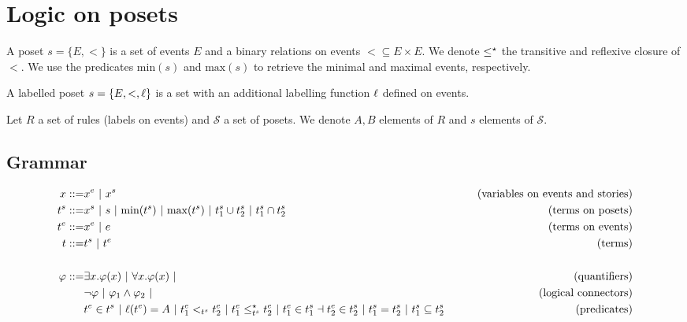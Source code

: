 \section{Logic on posets}

\begin{definition}[Poset]
  \label{def:poset}
  A poset $s=\{E,<\}$ is a set of events $E$ and a binary relations on events $< \subseteq E\times E$. We denote $\leq^{\star}$ the transitive and reflexive closure of $<$.
  We use the predicates $\text{min}(s)$ and $\text{max}(s)$ to retrieve the minimal and maximal events, respectively.

  A labelled poset $s=\{E,<,\ell\}$ is a set with an additional labelling function $\ell$ defined on events.
\end{definition}



Let $R$ a set of rules (labels on events) and $\mathcal{S}$ a set of posets.
We denote $A,B$ elements of $R$ and $s$ elements of $\mathcal{S}$.

\subsection{Grammar}

\begin{align*}
  x ::= & x^e ~|~ x^s & \tag{variables on events and stories} \\
  t^s ::= & x^s ~|~ s ~|~ \text{min}(t^s) ~|~ \text{max}(t^s) ~|~ t^s_1 \cup t^s_2 ~|~ t^s_1 \cap t^s_2 &\tag{terms on posets} \\
  t^e ::= & x^e ~|~ e & \tag{terms on events}\\
  t ::= & t^s ~|~ t^e & \tag{terms}\\
  \\
  \varphi ::= & \exists x.\varphi(x) ~|~ \forall x.\varphi(x) ~|&\tag{quantifiers}\\
  & \neg \varphi ~|~\varphi_1 \wedge \varphi_2~|&\tag{logical connectors}\\
  & t^e\in t^s ~|~ \ell(t^e) = A ~|~ t^e_1 <_{t^s} t^e_2 ~|~ t^e_1 \leq^{\star}_{t^s} t^e_2 ~|~ t^e_1\in t^s_1 \dashv t^e_2\in t^s_2~|~ t^s_1 = t^s_2 ~|~ t^s_1\subseteq t^s_2
  & \tag{predicates}\\
\end{align*}

